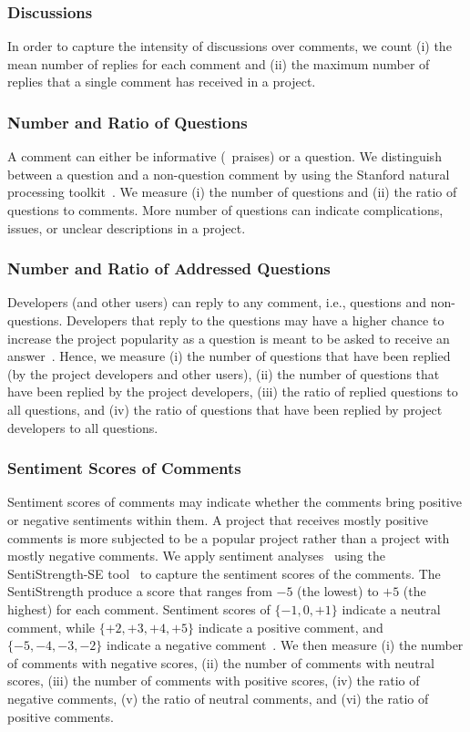\subsubsection*{Discussions} In order to capture the intensity of discussions over comments, we count (i) the mean number of
replies for each comment and (ii) the maximum number of replies that a single comment has received in a project.

\subsubsection*{Number and Ratio of Questions} A comment can either be informative (\eg~praises) or a question. We distinguish between a question and a non-question comment by using the Stanford natural processing toolkit~\cite{manning2014stanford}.
We measure (i) the number of questions and (ii) the ratio of questions to comments. More number of questions can indicate complications, issues, or unclear descriptions in a project.

\subsubsection*{Number and Ratio of Addressed Questions}
Developers (and other users) can reply to any comment, i.e., questions and non-questions.
Developers that reply to the questions may have a higher chance to increase the project popularity as a question is meant to be asked to receive an answer~\cite{ko2010power}.
Hence, we measure (i) the number of questions that have been replied (by the project developers and other users), (ii) the number of questions that have been replied by the project developers, (iii) the ratio of replied questions to all questions, and (iv) the ratio of questions that have been replied by project developers to all questions.

\subsubsection*{Sentiment Scores of Comments} Sentiment scores of comments may indicate whether the comments bring positive or negative sentiments within them.
A project that receives mostly positive comments is more subjected to be a popular project rather than a project with mostly negative comments.
We apply sentiment analyses~\cite{thelwall2010sentiment} using the SentiStrength-SE tool~\cite{islam2017leveraging} to capture the sentiment scores of the comments. The SentiStrength produce a score that ranges from $-5$ (the lowest) to $+5$ (the highest) for each comment.
Sentiment scores of $\{-1, 0, +1\}$ indicate a neutral comment, while $\{+2, +3, +4, +5\}$ indicate a positive comment, and $\{-5, -4, -3, -2\}$ indicate a negative comment~\cite{islam2017leveraging}.
We then measure (i) the number of comments with negative scores, (ii) the number of comments with neutral scores, (iii) the number of comments with positive scores, (iv) the ratio of negative comments, (v) the ratio of neutral comments, and (vi) the ratio of positive comments.

